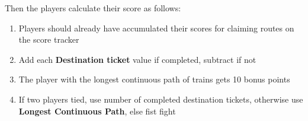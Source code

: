 \documentclass[12pt]{article}
\newenvironment{enumerateCustom}
{\begin{enumerate}
  \setlength{\itemsep}{1pt}
  \setlength{\parskip}{0pt}
  \setlength{\parsep}{0pt}}
{\end{enumerate}}
\begin{document}
\begin{mdframed}[style = customFrame]
\begin{multicols*}{2}
Then the players calculate their score as follows:
\begin{enumerateCustom}
	\item Players should already have accumulated their scores for claiming routes on the score tracker
	\item Add each \textbf{Destination ticket} value if completed, subtract if not
	\item The player with the longest continuous path of trains gets 10 bonus points
	\item If two players tied, use number of completed destination tickets, otherwise use \textbf{Longest Continuous Path}, else fist fight
\end{enumerateCustom}

\end{multicols*}
\end{mdframed}
\end{document}
